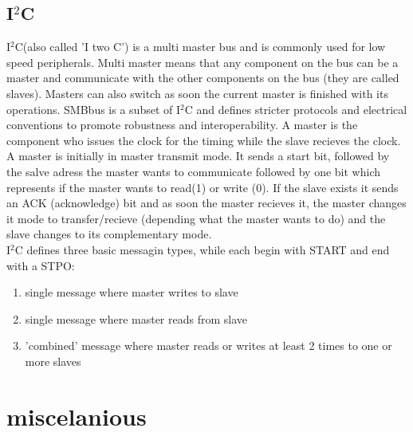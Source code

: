 \documentclass[a4paper]{scrartcl}
\begin{document}
        \subsection{I\(^2\)C}     
            I\(^2\)C(also called 'I two C') is a multi master bus and is commonly used for low speed peripherals. Multi master means that any component on the bus can be a
            master and communicate with the other components on the bus (they are called slaves). Masters can also switch as soon the current master is finished with its
            operations. SMBbus is a subset of I\(^2\)C and defines stricter protocols and electrical conventions to promote robustness and interoperability. A master is 
            the component who issues the clock for the timing while the slave recieves the clock. \\
            A master is initially in master transmit mode. It sends a start bit, followed by the salve adress the master wants to communicate followed by one bit which 
            represents if the master wants to read(1) or write (0). If the slave exists it sends an ACK (acknowledge) bit and as soon the master recieves it, the master changes
            it mode to transfer/recieve (depending what the master wants to do) and the slave changes to its complementary mode. \\
            I\(^2\)C defines three basic messagin types, while each begin with START and end with a STPO:
            \begin{enumerate}
                \item single message where master writes to slave
                \item single message where master reads from slave
                \item 'combined' message where master reads or writes at least 2 times to one or more slaves
            \end{enumerate}
    
    
    
    
    
    
    
    
    \section{miscelanious}
\end{document}
